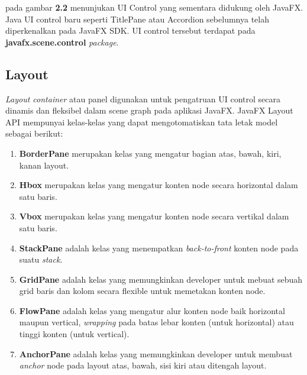 	pada gambar \textbf{2.2} menunjukan UI Control yang sementara didukung oleh JavaFX. Java UI control baru seperti TitlePane atau Accordion sebelumnya telah diperkenalkan pada JavaFX SDK. UI control tersebut terdapat pada \textbf{javafx.scene.control} \textit{package}.\cite{javafx}
 
\subsection{Layout}
\label{subs:Layout}
 \textit{Layout container} atau panel digunakan untuk pengatruan UI control secara dinamis dan fleksibel dalam scene graph pada aplikasi JavaFX. JavaFX Layout API mempunyai kelas-kelas yang dapat mengotomatiskan tata letak model sebagai berikut:\cite{javafx}
\begin{enumerate}
	\item \textbf{BorderPane} merupakan kelas yang mengatur bagian atas, bawah, kiri, kanan layout.
	\item \textbf{Hbox} merupakan kelas yang mengatur konten node secara horizontal dalam satu baris.
	\item  \textbf{Vbox} merupakan kelas yang mengatur konten node secara vertikal dalam satu baris.
	\item \textbf{StackPane} adalah kelas yang menempatkan \textit{back-to-front} konten node pada suatu \textit{stack}.
	\item \textbf{GridPane} adalah kelas yang memungkinkan developer untuk mebuat sebuah grid baris dan kolom secara flexible untuk memetakan konten node.
	\item \textbf{FlowPane} adalah kelas yang mengatur alur konten node baik horizontal maupun vertical, \textit{wrapping} pada batas lebar konten (untuk horizontal) atau tinggi konten (untuk vertical).
	\item \textbf{AnchorPane} adalah kelas yang memungkinkan developer untuk membuat \textit{anchor} node pada layout atas, bawah, sisi kiri atau ditengah layout. 
\end{enumerate}

